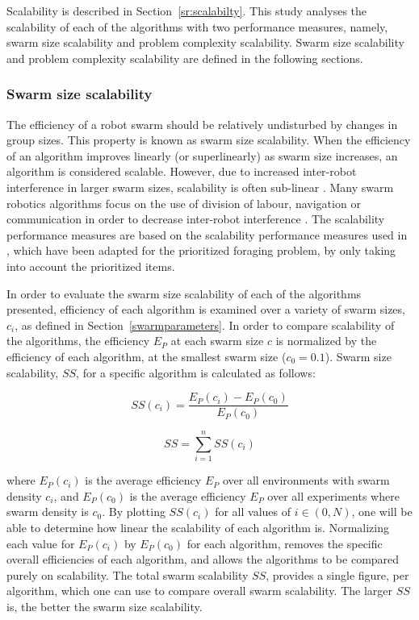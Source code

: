 Scalability is described in Section~\ref{sr:scalabilty}. This study analyses the scalability of each of the algorithms with two performance measures, namely, swarm size scalability and problem complexity scalability. Swarm size scalability and problem complexity scalability are defined in the following sections.

\subsubsection{Swarm size scalability}
\label{swarmsizescalability}
The efficiency of a robot swarm should be relatively undisturbed by changes in group sizes. This property is known as swarm size scalability. When the efficiency of an algorithm improves linearly (or superlinearly) as swarm size increases, an algorithm is considered scalable. However, due to increased inter-robot interference in larger swarm sizes, scalability is often sub-linear \cite{lerman2002mathematical}. Many swarm robotics algorithms focus on the use of division of labour, navigation or communication in order to decrease inter-robot interference \cite{lerman2002mathematical, schneider1998territorial}. The scalability performance measures are based on the scalability performance measures used in \cite{hecker2015beyond}, which have been adapted for the prioritized foraging problem, by only taking into account the prioritized items.

In order to evaluate the swarm size scalability of each of the algorithms presented, efficiency of each algorithm is examined over a variety of swarm sizes, $c_i$, as defined in Section~\ref{swarmparameters}. In order to compare scalability of the algorithms, the efficiency $E_P$ at each swarm size $c$ is normalized by the efficiency of each algorithm, at the smallest swarm size ($c_0=0.1$). Swarm size scalability, $SS$, for a specific algorithm is calculated as follows:

\begin{equation}
	SS(c_i) = \dfrac{E_P(c_i)-E_P(c_0)}{E_P(c_0)}
\end{equation}

\begin{equation}
	SS = \sum_{i=1}^{n} SS(c_i)
\end{equation}

where $E_P(c_i)$ is the average efficiency $E_P$ over all environments with swarm density $c_i$, and $E_P(c_0)$ is the average efficiency $E_P$ over all experiments where swarm density is $c_0$. By plotting $SS(c_i)$ for all values of $i\in(0,N)$, one will be able to determine how linear the scalability of each algorithm is. Normalizing each value for $E_P(c_i)$ by $E_P(c_0)$ for each algorithm, removes the specific overall efficiencies of each algorithm, and allows the algorithms to be compared purely on scalability. The total swarm scalability $SS$, provides a single figure, per algorithm, which one can use to compare overall swarm scalability. The larger $SS$ is, the better the swarm size scalability. 


